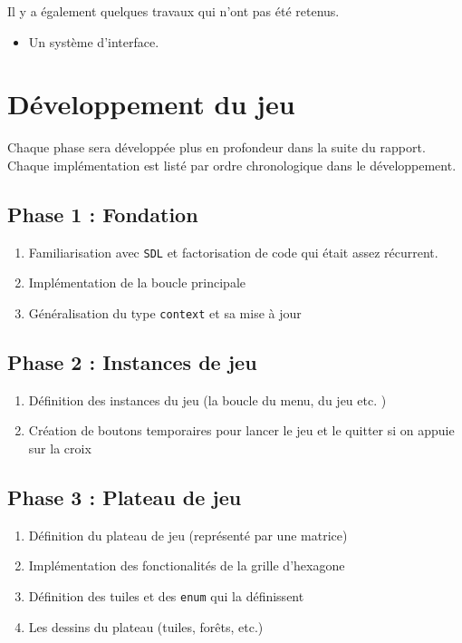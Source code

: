 \documentclass{article}
\begin{document}
Il y a également quelques travaux qui n'ont pas été retenus.

\begin{itemize}
    \item Un système d'interface. 
\end{itemize}


\section{Développement du jeu}
Chaque phase sera développée plus en profondeur dans la suite du rapport.
Chaque implémentation est listé par ordre chronologique dans le développement.

\subsection*{Phase 1 : Fondation}
\begin{enumerate}
    \item Familiarisation avec \texttt{SDL} et factorisation de code qui était assez récurrent.
    \item Implémentation de la boucle principale
    \item Généralisation du type \texttt{context} et sa mise à jour
\end{enumerate}

\subsection*{Phase 2 : Instances de jeu}
\begin{enumerate}
    \item Définition des instances du jeu (la boucle du menu, du jeu etc. )
    \item Création de boutons temporaires pour lancer le jeu et le quitter si on appuie sur la croix
\end{enumerate}


\subsection*{Phase 3 : Plateau de jeu}
\begin{enumerate}
    \item Définition du plateau de jeu (représenté par une matrice)
    \item Implémentation des fonctionalités de la grille d'hexagone
    \item Définition des tuiles et des \texttt{enum} qui la définissent
    \item Les dessins du plateau (tuiles, forêts, etc.)
\end{enumerate}
\end{document}
